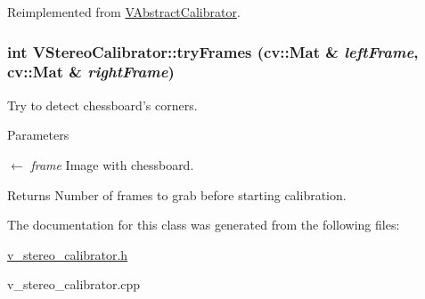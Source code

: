 Reimplemented from \hyperlink{classVAbstractCalibrator_a2c6ac60861d16f185930e7fbf09483f8}{VAbstractCalibrator}.

\hypertarget{classVStereoCalibrator_ac080bd54496fef9b9e115944ddc3ca34}{
\subsubsection[{tryFrames}]{\setlength{\rightskip}{0pt plus 5cm}int VStereoCalibrator::tryFrames (cv::Mat \& {\em leftFrame}, \/  cv::Mat \& {\em rightFrame})}}
\label{classVStereoCalibrator_ac080bd54496fef9b9e115944ddc3ca34}
Try to detect chessboard's corners. 
\begin{DoxyParams}{Parameters}
\item[\mbox{$\leftarrow$} {\em frame}]Image with chessboard. \end{DoxyParams}
\begin{DoxyReturn}{Returns}
Number of frames to grab before starting calibration. 
\end{DoxyReturn}


The documentation for this class was generated from the following files:\begin{DoxyCompactItemize}
\item 
\hyperlink{v__stereo__calibrator_8h}{v\_\-stereo\_\-calibrator.h}\item 
v\_\-stereo\_\-calibrator.cpp\end{DoxyCompactItemize}
